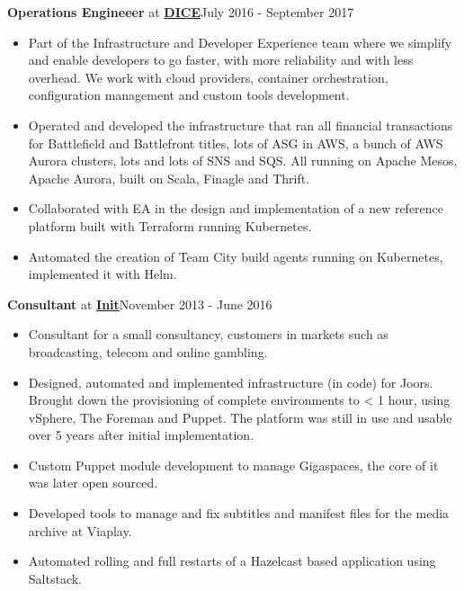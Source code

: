 \documentclass[8pt]{article}
\newenvironment{outerlist}[1][\enskip\textbullet]%
        {\begin{itemize}[#1]}{\end{itemize}%
         \vspace{-.6\baselineskip}}
\newcommand{\blankline}{\quad\pagebreak[2]}
\begin{document}
\textbf{Operations Engineeer} at \href{http://www.dice.se}{\textbf{DICE}}\hfill {July 2016 - September 2017}
\begin{outerlist}
\item[] Part of the Infrastructure and Developer Experience team where we simplify and enable developers to go faster, with more reliability and with less overhead. We work with cloud providers, container orchestration, configuration management and custom tools development.

\item Operated and developed the infrastructure that ran all financial transactions for Battlefield and Battlefront titles, lots of ASG in AWS, a bunch of AWS Aurora clusters, lots and lots of SNS and SQS. All running on Apache Mesos, Apache Aurora, built on Scala, Finagle and Thrift.
\item Collaborated with EA in the design and implementation of a new reference platform built with Terraform running Kubernetes. 
\item Automated the creation of Team City build agents running on Kubernetes, implemented it with Helm.
\end{outerlist}
\blankline

\textbf{Consultant} at \href{http://www.init.se}{\textbf{Init}}\hfill {November 2013 - June 2016}
\begin{outerlist}
\item[] Consultant for a small consultancy, customers in markets such as broadcasting, telecom and online gambling.

	\item Designed, automated and implemented infrastructure (in code) for Joors. Brought down the provisioning of complete environments to < 1 hour,
		using vSphere, The Foreman and Puppet. The platform was still in use and usable over 5 years after initial implementation.
	\item Custom Puppet module development to manage Gigaspaces, the core of it was later open sourced.
	\item Developed tools to manage and fix subtitles and manifest files for the media archive at Viaplay.
	\item Automated rolling and full restarts of a Hazelcast based application using Saltstack.
\end{outerlist}
\blankline
\end{document}
